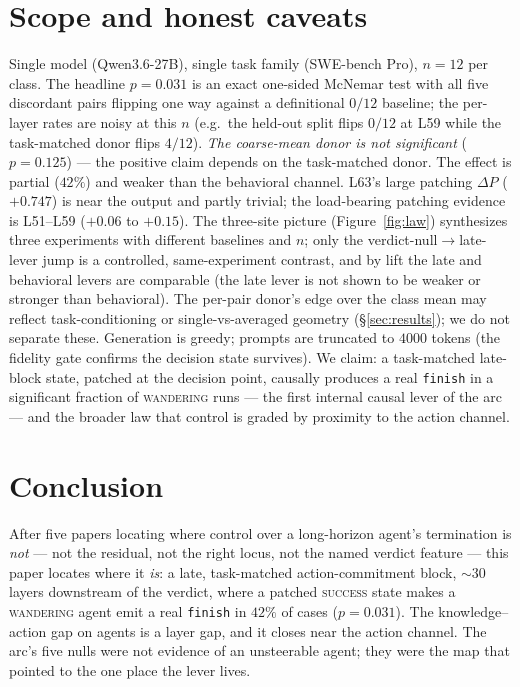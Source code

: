 \documentclass[11pt]{article}
\begin{document}
\section{Scope and honest caveats}\label{sec:scope}
Single model (Qwen3.6-27B), single task family (SWE-bench Pro), $n=12$ per class. The headline $p=0.031$ is an exact one-sided McNemar test with all five discordant pairs flipping one way against a definitional $0/12$ baseline; the per-layer rates are noisy at this $n$ (e.g.\ the held-out split flips $0/12$ at L59 while the task-matched donor flips $4/12$). \emph{The coarse-mean donor is not significant} ($p=0.125$) --- the positive claim depends on the task-matched donor. The effect is partial ($42\%$) and weaker than the behavioral channel. L63's large patching $\Delta P$ ($+0.747$) is near the output and partly trivial; the load-bearing patching evidence is L51--L59 ($+0.06$ to $+0.15$). The three-site picture (Figure~\ref{fig:law}) synthesizes three experiments with different baselines and $n$; only the verdict-null$\to$late-lever jump is a controlled, same-experiment contrast, and by lift the late and behavioral levers are comparable (the late lever is not shown to be weaker or stronger than behavioral). The per-pair donor's edge over the class mean may reflect task-conditioning or single-vs-averaged geometry (\S\ref{sec:results}); we do not separate these. Generation is greedy; prompts are truncated to $4000$ tokens (the fidelity gate confirms the decision state survives). We claim: a task-matched late-block state, patched at the decision point, causally produces a real \texttt{finish} in a significant fraction of \textsc{wandering} runs --- the first internal causal lever of the arc --- and the broader law that control is graded by proximity to the action channel.

\section{Conclusion}\label{sec:conclusion}
After five papers locating where control over a long-horizon agent's termination is \emph{not} --- not the residual, not the right locus, not the named verdict feature --- this paper locates where it \emph{is}: a late, task-matched action-commitment block, $\sim$30 layers downstream of the verdict, where a patched \textsc{success} state makes a \textsc{wandering} agent emit a real \texttt{finish} in $42\%$ of cases ($p=0.031$). The knowledge--action gap on agents is a layer gap, and it closes near the action channel. The arc's five nulls were not evidence of an unsteerable agent; they were the map that pointed to the one place the lever lives.
\end{document}
